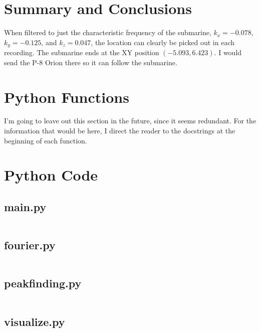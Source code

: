 \documentclass{article}
\begin{document}


    \section{Summary and Conclusions}
    When filtered to just the characteristic frequency of the submarine, $k_x=-0.078$, $k_y=-0.125$, and $k_z = 0.047$, the location can clearly be picked out in each recording. The submarine ends at the XY position $(-5.093, 6.423)$. I would send the P-8 Orion there so it can follow the submarine.

    
    

    \FloatBarrier
    \newpage
    \appendix
    \section{Python Functions}
        I'm going to leave out this section in the future, since it seems redundant. For the information that would be here, I direct the reader to the docstrings at the beginning of each function.

    \section{Python Code}

    \subsection{main.py}
    \inputminted{python}{../code/main.py}

    \subsection{fourier.py}
    \inputminted{python}{../code/fourier.py}

    \subsection{peakfinding.py}
    \inputminted{python}{../code/peak_finding.py}

    \subsection{visualize.py}
    \inputminted{python}{../code/visualize.py}
\end{document}
